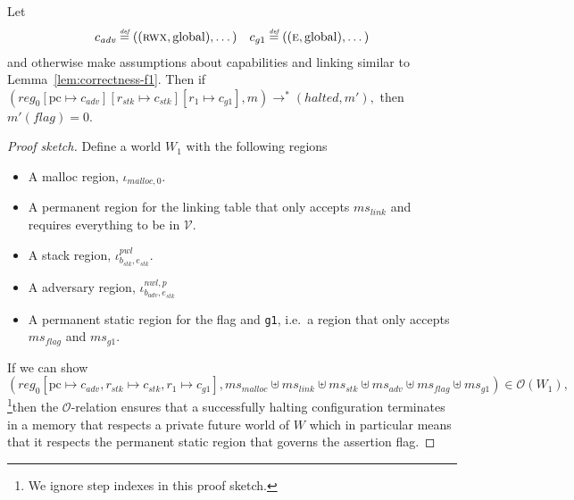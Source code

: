\documentclass[format=acmsmall, review=true, screen=true]{acmart}
\newcommand{\update}[2]{[#1 \mapsto #2]}
\newcommand{\defeq}{\stackrel{\textit{\tiny{def}}}{=}}
\newcommand{\var}[1]{\mathit{#1}}
\newcommand{\hs}{\var{ms}}
\newcommand{\ms}{\hs}
\newcommand{\pcreg}{\mathrm{pc}}
\newcommand{\reg}{\var{reg}}
\newcommand{\adv}{\var{adv}}
\newcommand{\link}{\var{link}}
\newcommand{\stk}{\var{stk}}
\newcommand{\flag}{\var{flag}}
\newcommand{\nwl}{\var{nwl}}
\newcommand{\pwl}{\var{pwl}}
\newcommand{\halted}{\mathit{halted}}
\newcommand{\codelabel}[1]{\mathit{#1}}
\newcommand{\malloc}{\codelabel{malloc}}
\newcommand{\asmType}{\plaindom{AsmType}}
\newcommand{\plaindom}[1]{\mathrm{#1}}
\newcommand{\intr}[2]{\mathcal{#1}}
\newcommand{\valueintr}[1]{\intr{V}{#1}}
\newcommand{\stdvr}{\valueintr{\asmType}}
\newcommand{\observations}{\mathcal{O}}
\newcommand{\plainperm}[1]{\textsc{#1}}
\newcommand{\entry}{\plainperm{e}}
\newcommand{\rwx}{\plainperm{rwx}}
\newcommand{\plainlocality}[1]{\mathrm{#1}}
\newcommand{\glob}{\plainlocality{global}}
\newcommand{\step}[1][]{\rightarrow_{#1}}
\newenvironment{toplas}{}{}
\begin{document}
\begin{lemma}
  \label{lem:correctness-g1}
  Let
\[
    \begin{array}{r@{}lr@{}l}
    c_{\var{adv}} & \;\defeq ((\rwx,\glob),\dots) & c_{g1} & \;\defeq ((\entry,\glob),\dots)
    \end{array}
\]
  and otherwise make assumptions about capabilities and linking similar to Lemma~\ref{lem:correctness-f1}.
  Then if $
  (\reg_0\update{\pcreg}{c_\adv}\update{r_\stk}{c_\stk}\update{r_1}{c_{g1}},m) \step^* (\halted,m'),$
  then $m'(\flag) = 0$.
\end{lemma}
\begin{toplas}
  \begin{proof}[Proof sketch]
    Define a world $W_1$ with the following regions
    \begin{itemize}
    \item A malloc region, $\iota_{\malloc,0}$.
    \item A permanent region for the linking table that only accepts $\ms_\link$ and requires everything to be in $\stdvr$.
    \item A stack region, $\iota^{\pwl}_{b_\stk,e_\stk}$.
    \item A adversary region, $\iota^{\nwl,p}_{b_\adv,e_\stk}$
    \item A permanent static region for the flag and \texttt{g1}, i.e.\ a region that only
      accepts $\ms_\flag$ and $\ms_{g1}$.
    \end{itemize}
    If we can show
    \begin{equation}
      (\reg_0[\pcreg \mapsto c_\adv,r_\stk\mapsto c_\stk,r_1\mapsto c_{g1}],\ms_\malloc \uplus \ms_\link \uplus \ms_\stk \uplus \ms_\adv\uplus \ms_\flag  \uplus \ms_{g1}) \in \observations(W_1),\label{eq:g1:main-O-res}
  \end{equation}
  \footnote{We ignore step indexes in this proof sketch.}then the $\observations$-relation ensures that a successfully halting configuration terminates in a memory that respects a private future world of $W$ which in particular means that it respects the permanent static region that governs the assertion flag.


\end{proof}
\end{toplas}
\end{document}
